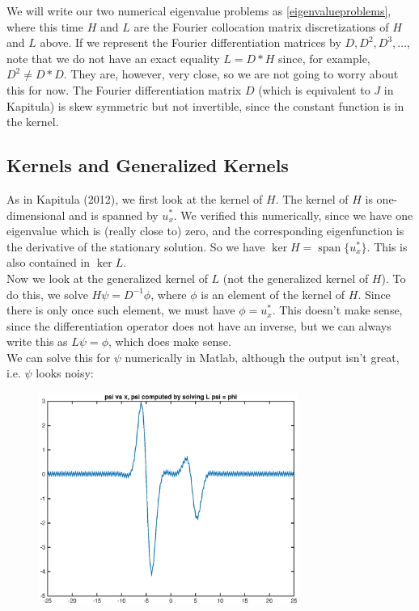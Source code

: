 \documentclass[12pt]{article}
\DeclareMathOperator{\spn}{span}
\begin{document}
We will write our two numerical eigenvalue problems as \eqref{eigenvalueproblems}, where this time $H$ and $L$ are the Fourier collocation matrix discretizations of $H$ and $L$ above. If we represent the Fourier differentiation matrices by $D, D^2, D^3, \dots$, note that we do not have an exact equality $L = D*H$ since, for example, $D^2 \neq D*D$. They are, however, very close, so we are not going to worry about this for now. The Fourier differentiation matrix $D$ (which is equivalent to $J$ in Kapitula) is skew symmetric but not invertible, since the constant function is in the kernel.\\

\subsection{Kernels and Generalized Kernels}

As in Kapitula (2012), we first look at the kernel of $H$. The kernel of $H$ is one-dimensional and is spanned by $u^*_x$. We verified this numerically, since we have one eigenvalue which is (really close to) zero, and the corresponding eigenfunction is the derivative of the stationary solution. So we have $\ker H = \spn\{ u^*_x \}$. This is also contained in $\ker L$.\\

Now we look at the generalized kernel of $L$ (not the generalized kernel of $H$). To do this, we solve $H\psi = D^{-1} \phi$, where $\phi$ is an element of the kernel of $H$. Since there is only once such element, we must have $\phi = u^*_x$. This doesn't make sense, since the differentiation operator does not have an inverse, but we can always write this as $L\psi = \phi$, which does make sense.\\

We can solve this for $\psi$ numerically in Matlab, although the output isn't great, i.e. $\psi$ looks noisy:

\begin{figure}[H]
	\includegraphics[width=8.5cm]{solvedpsi.eps}
\end{figure}
\end{document}
